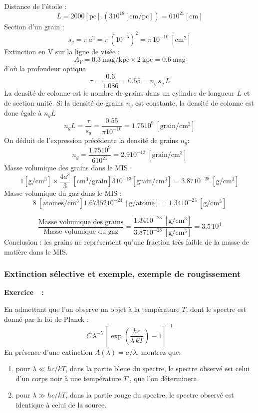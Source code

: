 \documentclass[a4paper,10pt]{report}
\newcounter{noexo}
\newenvironment{Exercise}[1][]{%
  \stepcounter{noexo}
  \medskip\noindent\textbf{Exercice~\thenoexo~:~#1}
  \medskip\par
  \addcontentsline{toc}{subsubsection}{Exercice~\thenoexo~:~#1}
}{}
\renewcommand{\u}[1]{\ensuremath{\mathrm{#1}}} %
\begin{document}
\begin{Answer}
  Distance de l'étoile :
  $$
  L = 2000[\u{pc}] .(3 10^{18} [\u{cm/pc}]) = 6 10^{21} [\u{cm}]
  $$
  Section d'un grain :
  $$
  s_g = \pi\,a^2 = \pi\,(10^{-5})^2 = \pi\,10^{-10}~[\u{cm^{2}}]
  $$
  Extinction en V sur la ligne de visée :
  $$
  A_V = 0.3~\u{mag/kpc}\times 2~\u{kpc} = 0.6~\u{mag}
  $$
  d'où la profondeur optique
  $$
  \tau = \frac{0.6}{1.086} = 0.55 = n_g\,s_g\,L
  $$
  La densité de colonne est le nombre de grains dans un cylindre de
  longueur $L$ et de section unité. Si la densité de grains $n_g$ est
  constante, la densité de colonne est donc égale à $n_g L$
  $$
  n_g L = \frac{\tau}{s_g} = \frac{0.55}{\pi 10^{-10}} = 1.75
  10^9~[\u{grain/cm^2}]
  $$
  On déduit de l'expression précédente la densité de grains $n_g$:
  $$
  n_g = \frac{1.75 10^{9}}{6 10^{21}} = 2.9
  10^{-13}~[\u{grain/cm^{3}}]
  $$
  Masse volumique des grains dans le MIS :
  $$
  1 [\u{g/cm^{3}}]\times \frac{4a^{3}}{3}~[\u{cm^3/grain}] 3 10^{-13}
  [\u{grain/cm^3}]= 3.87 10^{-28}~[\u{g/cm^3}]
  $$
  Masse volumique du gaz dans le MIS :
  $$
  8~[\u{atomes/cm^3}] 1.67352 10^{-24}~[\u{g/atome}] = 1.34
  10^{-23}~[\u{g/cm^3}]
  $$

  $$
  \frac{\text{Masse volumique des grains}}{\text{Masse volumique du
      gaz}} = \frac{1.34 10^{-23}~[\u{g/cm^3}]}{3.87
    10^{-28}~[\u{g/cm^3}]} = 3.5\,10^4
  $$
  Conclusion : les grains ne représentent qu'une fraction très faible de
  la masse de matière dans le MIS.
\end{Answer}

\subsubsection{Extinction sélective et exemple, exemple de rougissement}

\begin{Exercise}
  En admettant que l'on observe un objet à la température $T$, dont le
  spectre est donné par la loi de Planck :
  $$
  C\,\lambda^{-5}\,\left[\exp\left({\frac{hc}{\lambda\,kT}}\right)-1\right]^{-1}
  $$
  En présence d'une extinction $A(\lambda) = a/\lambda$, montrez que:
  \begin{enumerate}
  \item pour $\lambda \ll hc/kT$, dans la partie bleue du spectre, le
    spectre observé est celui d'un corps noir à une température $T'$,
    que l'on déterminera.
  \item pour $\lambda \gg hc/kT$, dans la partie rouge du spectre, le
    spectre observé est identique à celui de la source.
  \end{enumerate}
\end{Exercise}
\end{document}
